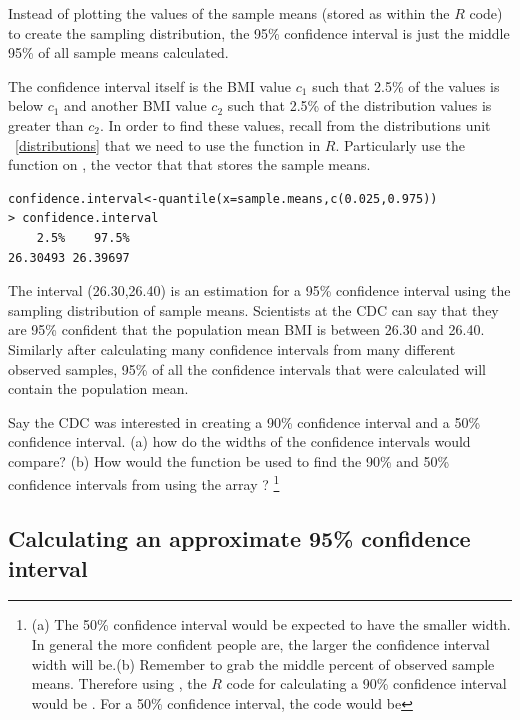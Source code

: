 Instead of plotting the values of the sample means (stored as  within the $R$ code) to create the sampling distribution, the 95\% confidence interval is just the middle 95\% of all sample means calculated. 

The confidence interval itself is the BMI value  $c_1$ such that 2.5\% of the  values is below $c_1$ and another BMI value $c_2$ such that 2.5\% of the distribution values is greater than $c_2$. In order to find these values, recall from the distributions unit ~\ref{distributions} that we need to use the  function in $R$. Particularly use the  function on , the vector that that stores the sample means. 
\begin{verbatim}
confidence.interval<-quantile(x=sample.means,c(0.025,0.975))
> confidence.interval
    2.5%    97.5% 
26.30493 26.39697 
\end{verbatim}
The interval (26.30,26.40) is an estimation for a 95\% confidence interval using the sampling distribution of sample means. Scientists at the CDC can say that they are 95\% confident that the population mean BMI is between 26.30 and 26.40. Similarly after calculating many confidence intervals from many different observed samples, 95\% of all the confidence intervals that were calculated will contain the population mean. 

\begin{exercise}
Say the CDC was interested in creating a 90\% confidence interval and a 50\% confidence interval. (a) how do the widths of the confidence intervals would compare? (b) How would the  function be used to find the 90\% and 50\% confidence intervals from using the array ?
 \footnote{(a) The 50\% confidence interval would be expected to have the smaller width. In general the more confident people are, the larger the confidence interval width will be.(b) Remember to grab the middle percent of observed sample means. Therefore using , the $R$ code for calculating a 90\% confidence interval  would be . For a 50\% confidence interval, the code would be }
\end{exercise}

\subsection{Calculating an approximate 95\% confidence interval}
\label{calculate95confidence}

